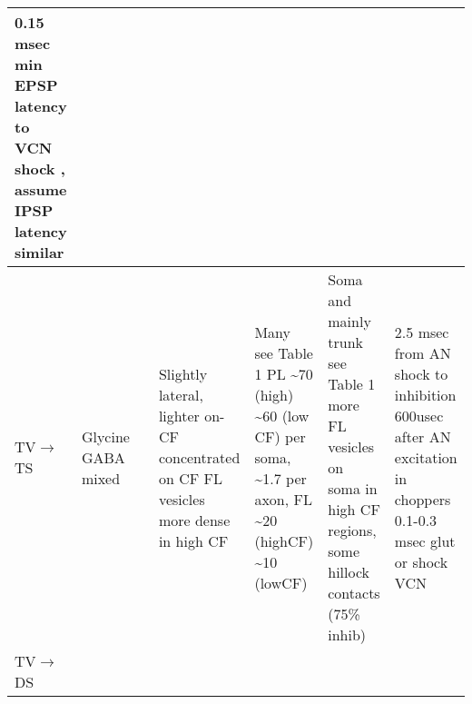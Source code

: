 \documentclass[10pt,a4paper]{article}
\begin{document}
\begin{landscape}
\begin{supertabular}{|m{2.121cm}|m{2.899cm}|m{2.243cm}|m{2.986cm}|m{2.294cm}|m{2.245cm}|m{3.303cm}|}
0.15 msec min EPSP latency to VCN shock , assume IPSP latency similar
\citep{ZhangOertel:1993}\\\hline
                      TV\ensuremath{\rightarrow}TS                        & 
Glycine\citep{OertelWickesberg:1993,OstapoffMorestEtAl:1999,SaintBensonEtAl:1991,WickesbergOertel:1993}
                GABA mixed \citep{OsenOttersenEtAl:1990}                  & 
   \citep{HartyManis:1998,OertelWickesberg:1993,WickesbergOertel:1993}    & 
Slightly lateral, lighter on-CF \citep{OstapoffMorestEtAl:1999} concentrated
on CF \citep{ZhangOertel:1993} FL vesicles more dense in high CF
                      \citep{JosephsonMorest:1998}                        & Many \citep{OstapoffMorestEtAl:1999} see
Table 1 \citep{SmithRhode:1989} PL \~{}70 (high) \~{}60 (low CF) per soma,
\~{}1.7 per axon, FL \~{}20 (highCF) \~{}10 (lowCF)
                      \citep{JosephsonMorest:1998}                        & Soma and mainly trunk
\citep{AltschulerJuizEtAl:1993} see Table 1\citep{SmithRhode:1989} more FL
vesicles on soma in high CF regions, some hillock contacts (75\% inhib)
                      \citep{JosephsonMorest:1998}                        & 2.5 msec from AN shock to inhibition
\citep{WickesbergOertel:1993} 600usec after AN excitation in choppers
\citep{Wickesberg:1996} 0.1-0.3 msec glut or shock VCN
\citep{ZhangOertel:1993}\\\hline
                      TV\ensuremath{\rightarrow}DS                        & 


\end{supertabular}
\end{landscape}
\end{document}
